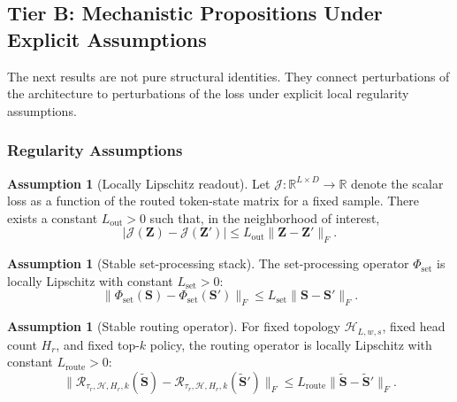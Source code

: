 \documentclass{article}
\theoremstyle{plain}
\theoremstyle{definition}
\newtheorem{assumption}[theorem]{Assumption}
\theoremstyle{remark}
\begin{document}
\subsection{Tier B: Mechanistic Propositions Under Explicit Assumptions}
\label{sec:tier-b}

The next results are not pure structural identities. They connect perturbations of the architecture to perturbations of the loss under explicit local regularity assumptions.

\subsubsection{Regularity Assumptions}
\label{sec:tier-b-assumptions}

\begin{assumption}[Locally Lipschitz readout]
\label{ass:lipschitz-readout}
Let $\mathcal J:\mathbb R^{L\times D}\to\mathbb R$ denote the scalar loss as a
function of the routed token-state matrix for a fixed sample. There exists a
constant $L_{\mathrm{out}}>0$ such that, in the neighborhood of interest,
\begin{equation}
\label{eq:lipschitz-readout-assumption}
|\mathcal J(\mathbf{Z})-\mathcal J(\mathbf{Z}')|
\le
L_{\mathrm{out}}\|\mathbf{Z}-\mathbf{Z}'\|_F.
\end{equation}
\end{assumption}

\begin{assumption}[Stable set-processing stack]
\label{ass:stable-set-stack}
The set-processing operator $\Phi_{\mathrm{set}}$ is locally Lipschitz with constant $L_{\mathrm{set}}>0$:
\begin{equation}
\label{eq:lipschitz-set-stack-assumption}
\|\Phi_{\mathrm{set}}(\mathbf{S})-\Phi_{\mathrm{set}}(\mathbf{S}')\|_F
\le
L_{\mathrm{set}}\|\mathbf{S}-\mathbf{S}'\|_F.
\end{equation}
\end{assumption}

\begin{assumption}[Stable routing operator]
\label{ass:stable-routing}
For fixed topology $\mathcal{H}_{L,w,s}$, fixed head count $H_r$, and fixed top-$k$ policy, the routing operator is locally Lipschitz with constant $L_{\mathrm{route}}>0$:
\begin{equation}
\label{eq:lipschitz-routing-assumption}
\|\mathcal{R}_{\tau_r,\mathcal{H},H_r,k}(\tilde{\mathbf{S}})
-
\mathcal{R}_{\tau_r,\mathcal{H},H_r,k}(\tilde{\mathbf{S}}')\|_F
\le
L_{\mathrm{route}}
\|\tilde{\mathbf{S}}-\tilde{\mathbf{S}}'\|_F.
\end{equation}
\end{assumption}
\end{document}
